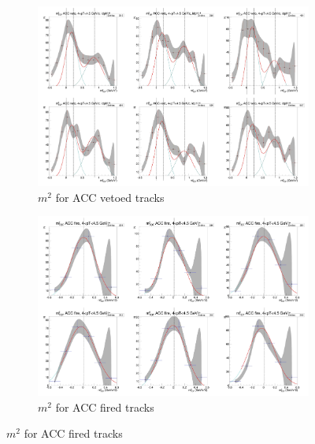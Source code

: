 \begin{figure}[H]
  \ContinuedFloat
    \begin{subfigure}{1\textwidth}
    \includegraphics[width=1\textwidth]{hiptfits/pos/PSm2_cent0_ich1_accfire0_ptbin14.jpg}
    \caption{$m^2$ for ACC vetoed tracks}
    \end{subfigure}
    \begin{subfigure}{1\textwidth}
    \includegraphics[width=1\textwidth]{hiptfits/pos/PSm2_cent0_ich1_accfire1_ptbin14.jpg}
    \caption{$m^2$ for ACC fired tracks}
    \end{subfigure}  
\end{figure}
